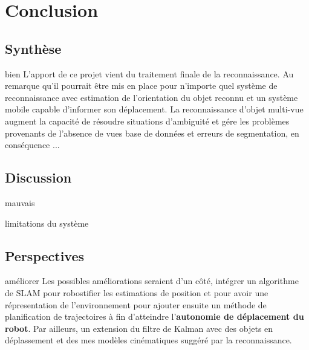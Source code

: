 \chapter{Conclusion}

\section{Synthèse}  bien
L'apport de ce projet vient du traitement finale de la reconnaissance. Au remarque qu'il pourrait être mis en place pour n'importe quel système de reconnaissance avec estimation de l'orientation du objet reconnu et un système mobile capable d'informer son déplacement. La reconnaissance d'objet multi-vue augment la capacité de résoudre situations d'ambiguité et gére les problèmes provenants de l'absence de vues base de données et erreurs de segmentation, en conséquence ...

\section{Discussion} mauvais

limitations du système

\section{Perspectives} améliorer
Les possibles améliorations seraient d'un côté, intégrer un algorithme de SLAM pour robostifier les estimations de position et pour avoir une répresentation de l'environnement pour ajouter ensuite un méthode de planification de trajectoires à fin d'atteindre l'\textbf{autonomie de déplacement du robot}. Par ailleurs, un extension du filtre de Kalman avec des objets en déplassement et des mes modèles cinématiques suggéré par la reconnaissance.




